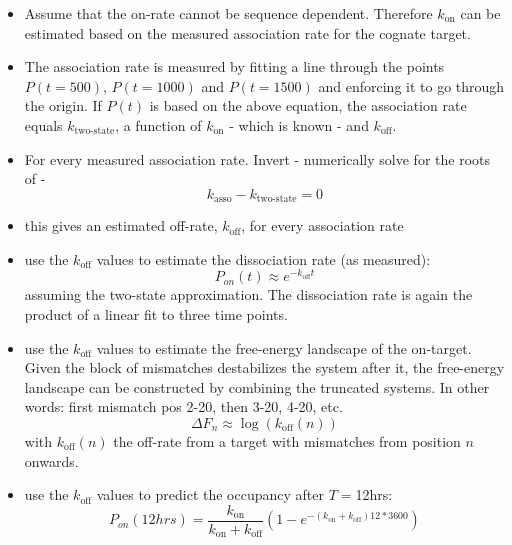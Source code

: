 \documentclass[a4paper,twoside]{revtex4-1}
\newcommand{\rate }[1]{\ensuremath{k_{\text{#1}}} }
\begin{document}
\begin{itemize}
\item Assume that the on-rate cannot be sequence dependent. Therefore $\rate{on}$ can be estimated based on the measured association rate for the cognate target.
\item The association rate is measured by fitting a line through the points $P(t=500)$, $P(t=1000)$ and $P(t=1500)$ and enforcing it to go through the origin. If $P(t)$ is based on the above equation, the association rate equals $\rate{two-state}$, a function of $\rate{on}$ - which is known -  and $\rate{off}$.
\item For every measured association rate. Invert - numerically solve for the roots of - 
\begin{equation}
\rate{asso} - \rate{two-state} = 0 
\end{equation} 
\item this gives an estimated off-rate, $\rate{off}$, for every association rate 
\item use the $\rate{off}$ values to estimate the dissociation rate (as measured):
\begin{equation}
P_{on}(t) \approx e^{-\rate{off}t}
\end{equation}
assuming the two-state approximation. The dissociation rate is again the product of a linear fit to three time points. 
\item use the $\rate{off}$ values to estimate the free-energy landscape of the on-target. Given the block of mismatches destabilizes the system after it, the free-energy landscape can be constructed by combining the truncated systems. In other words: first mismatch pos 2-20, then 3-20, 4-20, etc. 
\begin{equation}
\Delta F_n \approx \log(\rate{off}(n))
\end{equation}
with $\rate{off}(n)$ the off-rate from a target with mismatches from position $n$ onwards.
\item use the $\rate{off}$ values to predict the occupancy after $T=$12hrs:
\begin{equation}
P_{on}(12hrs) = \frac{\rate{on}}{ \rate{on} + \rate{off}} \left(1 - e^{-(\rate{on}+\rate{off})12*3600} \right)
\end{equation} 
\end{itemize}
\end{document}
